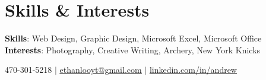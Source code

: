 \documentclass[letterpaper,11pt]{article}
\begin{document}
\section{Skills \& Interests}
 \begin{itemize}[leftmargin=0.15in, label={}]
    \small{\item{
    \vspace{1mm}
     \textbf{Skills}{: Web Design, Graphic Design, Microsoft Excel, Microsoft Office} \\
     \vspace{1mm}
     \textbf{Interests}{: Photography, Creative Writing, Archery, New York Knicks} \\
     \vspace{1mm}

    }}
 \end{itemize}
 \begin{center}
    
\small 470-301-5218 $|$
\href{mailto:ADD EMAIL HERE@x.com}{\underline{ethanlooyt@gmail.com}} $|$
\href{ADD LINKEDIN PAGE HERE}{\underline{linkedin.com/in/andrew}} 
\end{center}
\end{document}
